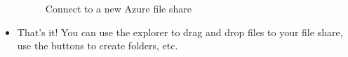 \begin{itemize}
\begin{figure}
        \caption{Connect to a new Azure file share}
        \label{figure:az-step4}
        \end{figure}
    \item That's it! You can use the explorer to drag and drop files to your file share, use the buttons to
    create folders, etc.
\end{itemize}
